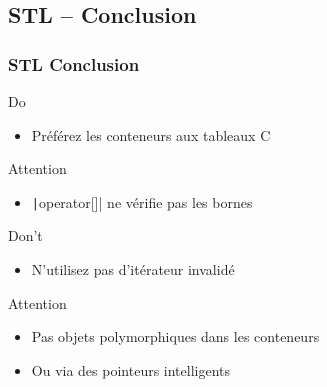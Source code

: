 \documentclass[C++.tex]{subfiles}
\begin{document}
\subsection*{STL -- Conclusion}
\begin{frame}[fragile]
	\frametitle{STL Conclusion}
	\begin{exampleblock}{Do}
		\begin{itemize}
			\item Préférez les conteneurs aux tableaux C
		\end{itemize}
	\end{exampleblock}

	\begin{alertblock}{Attention}
		\begin{itemize}
			\item \texttt|operator[]| ne vérifie pas les bornes
		\end{itemize}

	\end{alertblock}

	\begin{alertblock}{Don't}
		\begin{itemize}
			\item N'utilisez pas d'itérateur invalidé
		\end{itemize}
	\end{alertblock}

	\begin{alertblock}{Attention}
		\begin{itemize}
			\item Pas objets polymorphiques dans les conteneurs
			\item Ou via des pointeurs intelligents
		\end{itemize}
	\end{alertblock}
\end{frame}
\end{document}
